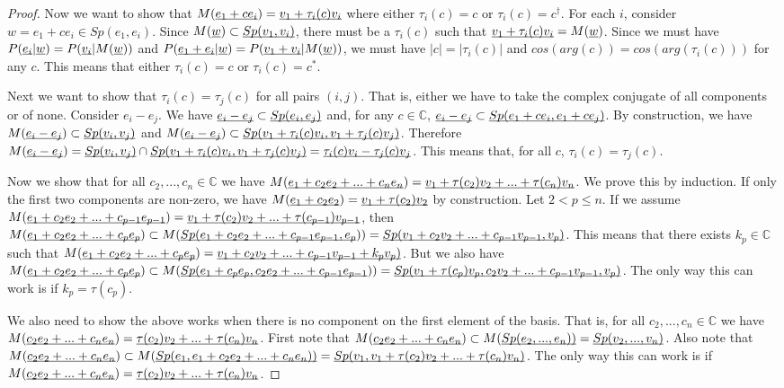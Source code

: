\documentclass[aps,prl,amsmath,amssymb,twocolumn,nofootinbib]{revtex4}
\theoremstyle{plain}
\theoremstyle{definition}
\theoremstyle{remark}
\newcommand{\pj}[1] {\underbar{$#1$}}
\begin{document}
\begin{proof}
  Now we want to show that $M(\pj{e_1 + c e_i})=\pj{v_1 + \tau_i(c)
    v_i}$ where either $\tau_i(c) = c$ or $\tau_i(c) = c^\dagger$. For
  each $i$, consider $w = e_1 + c e_i \in Sp(e_1, e_i)$. Since
  $M(\pj{w}) \subset \pj{Sp(v_1, v_i)}$, there must be a $\tau_i(c)$
  such that $\pj{v_1 + \tau_i(c) v_i} = M(\pj{w})$. Since we must have
  $P(\pj{e_i} | \pj{w}) = P(\pj{v_i} | M(\pj{w}))$ and $P(\pj{e_1 +
    e_i} | \pj{w}) = P(\pj{v_1 + v_i} | M(\pj{w}))$, we must have
  $|c| = |\tau_i(c)|$ and $cos(arg(c)) = cos(arg(\tau_i(c)))$ for any
  $c$. This means that either $\tau_i(c) = c$ or $\tau_i(c) =
  c^*$.
  
  Next we want to show that $\tau_i(c) = \tau_j(c)$ for all pairs $(i,j)$. That is, either we have to take the complex conjugate of all components or of none. Consider $e_i - e_j$. We have $\pj{e_i - e_j} \subset \pj{Sp(e_i, e_j)}$ and, for any $c \in \mathbb{C}$, $\pj{e_i - e_j} \subset \pj{Sp(e_1 + c e_i, e_1 + c e_j)}$. By construction, we have $M(\pj{e_i - e_j})\subset \pj{Sp(v_i, v_j)}$ and $M(\pj{e_i - e_j})\subset \pj{Sp(v_1 + \tau_i(c) v_i, v_1 + \tau_j(c) v_j)}$. Therefore $M(\pj{e_i - e_j}) = \pj{Sp(v_i, v_j)} \cap \pj{Sp(v_1 + \tau_i(c) v_i, v_1 + \tau_j(c) v_j)} = \pj{\tau_i(c) v_i - \tau_j(c) v_j}$. This means that, for all $c$, $\tau_i(c) = \tau_j(c)$.
  
  Now we show that for all $c_2, ..., c_n \in \mathbb{C}$ we have $M(\pj{e_1 + c_2 e_2 + ... + c_n e_n}) = \pj{v_1 + \tau(c_2) v_2 + ... + \tau(c_n) v_n}$. We prove this by induction. If only the first two components are non-zero, we have  $M(\pj{e_1 + c_2 e_2}) = \pj{v_1 + \tau(c_2) v_2}$ by construction. Let $2 < p \leq n$. If we assume $M(\pj{e_1 + c_2 e_2 + ... + c_{p-1} e_{p-1}}) = \pj{v_1 + \tau(c_2) v_2 + ... + \tau(c_{p-1}) v_{p-1}}$, then $M(\pj{e_1 + c_2 e_2 + ... + c_p e_p}) \subset M(\pj{Sp(e_1 + c_2 e_2 + ... + c_{p-1} e_{p-1}, e_p})) = \pj{Sp(v_1 + c_2 v_2 + ... + c_{p-1} v_{p-1}, v_p)}$. This means that there exists $k_p \in \mathbb{C}$ such that $M(\pj{e_1 + c_2 e_2 + ... + c_p e_p}) = \pj{v_1 + c_2 v_2 + ... + c_{p-1} v_{p-1} + k_p v_p)}$. But we also have $M(\pj{e_1 + c_2 e_2 + ... + c_p e_p}) \subset M(\pj{Sp(e_1 + c_p e_p, c_2 e_2 + ... + c_{p-1} e_{p-1}})) = \pj{Sp(v_1 + \tau(c_p) v_p, c_2 v_2 + ... + c_{p-1} v_{p-1}, v_p)}$. The only way this can work is if $k_p = \tau(c_p)$.

  We also need to show the above works when there is no component on the first element of the basis. That is, for all $c_2, ..., c_n \in \mathbb{C}$ we have $M(\underbar{$c_2 e_2 + ... + c_n e_n$}) = \underbar{$\tau(c_2) v_2 + ... + \tau(c_n) v_n$}$. First note that $M(\underbar{$c_2 e_2 + ... + c_n e_n$}) \subset M(\underbar{$Sp(e_2, ..., e_n)$)} = \underbar{$Sp(v_2, ..., v_n)$}$. Also note that $M(\underbar{$c_2 e_2 + ... + c_n e_n$}) \subset M(\underbar{$Sp(e_1, e_1 + c_2 e_2 + ... + c_n e_n)$)} = \underbar{$Sp(v_1, v_1 + \tau(c_2) v_2 + ... + \tau(c_n) v_n)$}$. The only way this can work is if $M(\underbar{$c_2 e_2 + ... + c_n e_n$}) = \underbar{$\tau(c_2) v_2 + ... + \tau(c_n) v_n$}$.
  

\end{proof}
\end{document}
